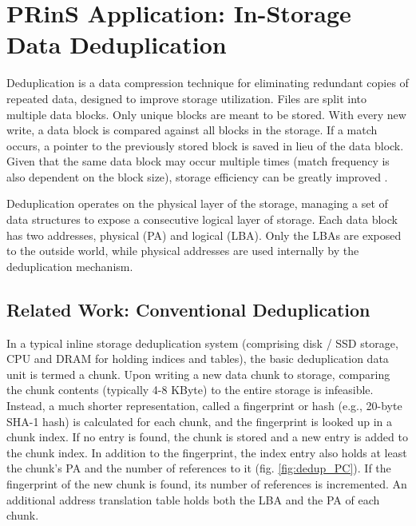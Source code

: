 \documentclass{superfri}
\begin{document}
	
	\section{PRinS Application: In-Storage Data Deduplication}
	\label{sec:dedup}
	Deduplication is a data compression technique for eliminating redundant copies of repeated data, designed to improve storage utilization. Files are split into multiple data blocks. Only unique blocks are meant to be stored. With every new write, a data block is compared against all blocks in the storage. If a match occurs, a pointer to the previously stored block is saved in lieu of the data block. Given that the same data block may occur multiple times (match frequency is also dependent on the block size), storage efficiency can be greatly improved \cite{zhu2008avoiding}.
	
	Deduplication operates on the physical layer of the storage, managing a set of data structures to expose a consecutive logical layer of storage. Each data block has two addresses, physical (PA) and logical (LBA). Only the LBAs are exposed to the outside world, while physical addresses are used internally by the deduplication mechanism.
	
	\subsection{Related Work: Conventional Deduplication}
	
	In a typical inline storage deduplication system (comprising disk / SSD storage, CPU and DRAM for holding indices and tables), the basic deduplication data unit is termed a chunk. Upon writing a new data chunk to storage, comparing the chunk contents (typically 4-8 KByte) to the entire storage is infeasible. Instead, a much shorter representation, called a fingerprint or hash (e.g., 20-byte SHA-1 hash) is calculated for each chunk, and the fingerprint is looked up in a chunk index. If no entry is found, the chunk is stored and a new entry is added to the chunk index. In addition to the fingerprint, the index entry also holds at least the chunk's PA and the number of references to it (fig. \ref{fig:dedup_PC}). If the fingerprint of the new chunk is found, its number of references is incremented. An additional address translation table holds both the LBA and the PA of each chunk.
	
\end{document}
